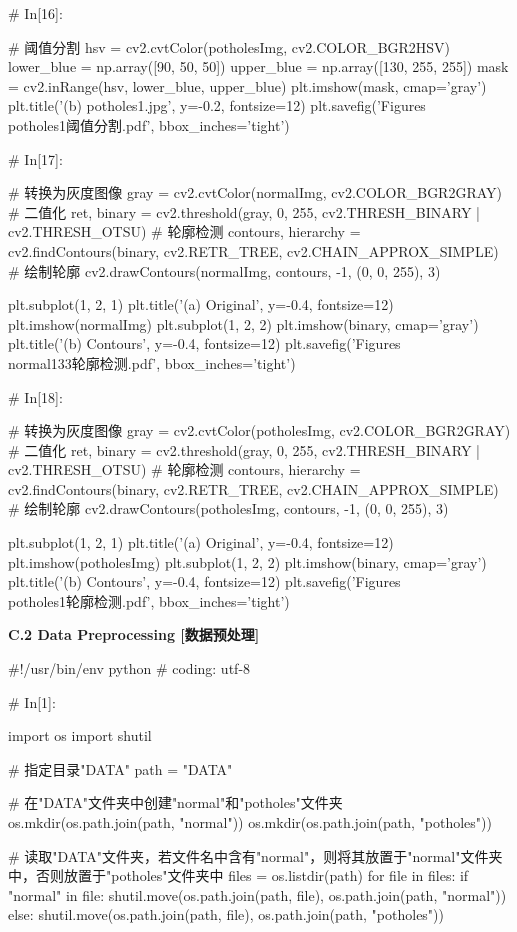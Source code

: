 \documentclass{MathorCupmodeling}
\begin{document}
\begin{python}
# In[16]:


# 阈值分割
hsv = cv2.cvtColor(potholesImg, cv2.COLOR_BGR2HSV)
lower_blue = np.array([90, 50, 50])
upper_blue = np.array([130, 255, 255])
mask = cv2.inRange(hsv, lower_blue, upper_blue)
plt.imshow(mask, cmap='gray')
plt.title('(b) potholes1.jpg', y=-0.2, fontsize=12)
plt.savefig('Figures\\potholes1阈值分割.pdf', bbox_inches='tight')

# In[17]:


# 转换为灰度图像
gray = cv2.cvtColor(normalImg, cv2.COLOR_BGR2GRAY)
# 二值化
ret, binary = cv2.threshold(gray, 0, 255, cv2.THRESH_BINARY | cv2.THRESH_OTSU)
# 轮廓检测
contours, hierarchy = cv2.findContours(binary, cv2.RETR_TREE, cv2.CHAIN_APPROX_SIMPLE)
# 绘制轮廓
cv2.drawContours(normalImg, contours, -1, (0, 0, 255), 3)

plt.subplot(1, 2, 1)
plt.title('(a) Original', y=-0.4, fontsize=12)
plt.imshow(normalImg)
plt.subplot(1, 2, 2)
plt.imshow(binary, cmap='gray')
plt.title('(b) Contours', y=-0.4, fontsize=12)
plt.savefig('Figures\\normal133轮廓检测.pdf', bbox_inches='tight')

# In[18]:


# 转换为灰度图像
gray = cv2.cvtColor(potholesImg, cv2.COLOR_BGR2GRAY)
# 二值化
ret, binary = cv2.threshold(gray, 0, 255, cv2.THRESH_BINARY | cv2.THRESH_OTSU)
# 轮廓检测
contours, hierarchy = cv2.findContours(binary, cv2.RETR_TREE, cv2.CHAIN_APPROX_SIMPLE)
# 绘制轮廓
cv2.drawContours(potholesImg, contours, -1, (0, 0, 255), 3)

plt.subplot(1, 2, 1)
plt.title('(a) Original', y=-0.4, fontsize=12)
plt.imshow(potholesImg)
plt.subplot(1, 2, 2)
plt.imshow(binary, cmap='gray')
plt.title('(b) Contours', y=-0.4, fontsize=12)
plt.savefig('Figures\\potholes1轮廓检测.pdf', bbox_inches='tight')
\end{python}

\textbf{C.2 Data Preprocessing [数据预处理]}
\begin{python}
#!/usr/bin/env python
# coding: utf-8

# In[1]:


import os
import shutil

# 指定目录"DATA"
path = "DATA"

# 在"DATA"文件夹中创建"normal"和"potholes"文件夹
os.mkdir(os.path.join(path, "normal"))
os.mkdir(os.path.join(path, "potholes"))

# 读取"DATA"文件夹，若文件名中含有"normal"，则将其放置于"normal"文件夹中，否则放置于"potholes"文件夹中
files = os.listdir(path)
for file in files:
    if "normal" in file:
        shutil.move(os.path.join(path, file), os.path.join(path, "normal"))
    else:
        shutil.move(os.path.join(path, file), os.path.join(path, "potholes"))

\end{python}
\end{document}
